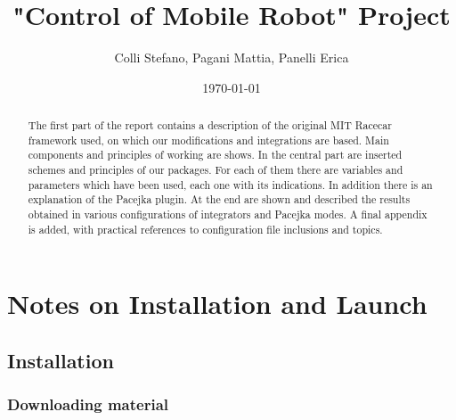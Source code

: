 \documentclass[12pt, letterpaper]{report}
\title{"Control of Mobile Robot" Project}
\author{Colli Stefano, Pagani Mattia, Panelli Erica}
\date{\today}
\begin{document}
	


\begin{abstract}
The first part of the report contains a description of the original MIT Racecar framework used, on which our modifications and integrations are based. Main components and principles of working are shows. In the central part are inserted schemes and principles of our packages. For each of them there are variables and parameters which have been used, each one with its indications. In addition there is an explanation of the Pacejka plugin. At the end are shown and described the results obtained in various configurations of integrators and Pacejka modes. A final appendix is added, with practical references to configuration file inclusions and topics.
\end{abstract}

\tableofcontents

\newpage

%

\chapter{Notes on Installation and Launch}

\section{Installation}

\subsection{Downloading material}
\end{document}
